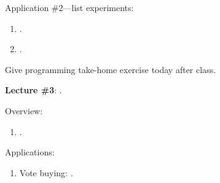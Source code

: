 \documentclass[letterpaper]{article}\usepackage[]{graphicx}\usepackage[svgnames]{xcolor}
\renewenvironment{itemize}{
  \begin{list}{}{
    \setlength{\leftmargin}{1.5em}
  }
}{
  \end{list}
}
\begin{document}
\begin{enumerate}
\begin{itemize}
\begin{enumerate}
         \end{enumerate}

        \item[$\diamond$] Application \#2---list experiments:

          \begin{enumerate}

              \item[$\bullet$] \href{https://doi.org/10.1093/pan/mpr048}{}.

              \item[$\bullet$] \href{https://link.springer.com/10.1057/s41269-020-00174-4}{}.


          \end{enumerate}
             \item[{\color{red}$\diamond$}] {\color{red}Give programming take-home exercise today after class}. 
            

      \end{itemize}


  \item {\bf Lecture \#3}:  {\color{ForestGreen}{\bf Lab Experiments}}.

  
        \begin{itemize} 

        \item[$\diamond$] Overview:

        \begin{enumerate}
          \item[$\bullet$] \href{https://doi.org/10.1017/gov.2018.14}{}.

          
        \end{enumerate}

       \item[$\diamond$] Applications:



           \begin{enumerate}

           \item[$\bullet$] Vote buying: \href{https://doi.org/10.1016/j.electstud.2022.102497}{}.


\end{enumerate}
\end{itemize}
\end{enumerate}
\end{document}
